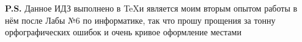 \documentclass[fleqn, 12pt]{article}
\begin{document}

\setlength{\mathindent}{0.0pt}
\tableofcontents

\vfill
{\bf P.S.} Данное ИДЗ выполнено в \TeX \space и является моим вторым опытом работы в нём после Лабы №6 по информатике, 
так что прошу прощения за тонну орфографических ошибок и очень кривое оформление местами







\end{document}
